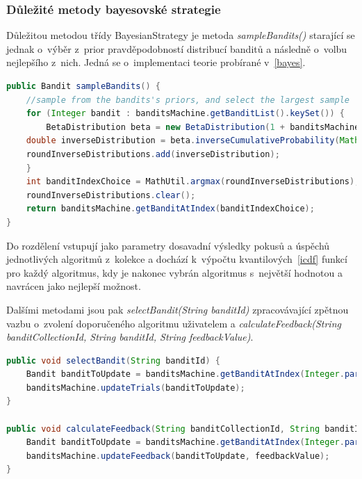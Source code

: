 \documentclass[thesis=M,czech]{FITthesis}[2014/05/07]
\begin{document}
\subsubsection{Důležité metody bayesovské strategie}
	Důležitou metodou třídy BayesianStrategy je metoda \emph{sampleBandits()} starající se jednak o~výběr z~prior pravděpodobností distribucí banditů a následně o~volbu nejlepšího z~nich. Jedná se o~implementaci teorie probírané v~\ref{bayes}.
	
\begin{lstlisting}[language=java]
public Bandit sampleBandits() {
    //sample from the bandits's priors, and select the largest sample
    for (Integer bandit : banditsMachine.getBanditList().keySet()) {
        BetaDistribution beta = new BetaDistribution(1 + banditsMachine.getBanditAtIndex(bandit).getSuccesses(), 1 + banditsMachine.getBanditAtIndex(bandit).getTrials() - banditsMachine.getBanditAtIndex(bandit).getSuccesses());
    double inverseDistribution = beta.inverseCumulativeProbability(Math.random());
    roundInverseDistributions.add(inverseDistribution);
    }
    int banditIndexChoice = MathUtil.argmax(roundInverseDistributions);
    roundInverseDistributions.clear();
    return banditsMachine.getBanditAtIndex(banditIndexChoice);
}
\end{lstlisting}	

Do rozdělení vstupují jako parametry dosavadní výsledky pokusů a úspěchů jednotlivých algoritmů z~kolekce a dochází k~výpočtu kvantilových~\ref{icdf} funkcí pro každý algoritmus, kdy je nakonec vybrán algoritmus s~největší hodnotou a navrácen jako nejlepší možnost. 

Dalšími metodami jsou pak \emph{selectBandit(String banditId)} zpracovávající zpětnou vazbu o~zvolení doporučeného algoritmu uživatelem a \emph{calculateFeedback(String banditCollectionId, String banditId, String feedbackValue)}. 

\begin{lstlisting}[language=java]
public void selectBandit(String banditId) {
    Bandit banditToUpdate = banditsMachine.getBanditAtIndex(Integer.parseInt(banditId));        
    banditsMachine.updateTrials(banditToUpdate);           
}

public void calculateFeedback(String banditCollectionId, String banditId, String feedbackValue) {
    Bandit banditToUpdate = banditsMachine.getBanditAtIndex(Integer.parseInt(banditId));
    banditsMachine.updateFeedback(banditToUpdate, feedbackValue);   
}  
\end{lstlisting}	
\end{document}
